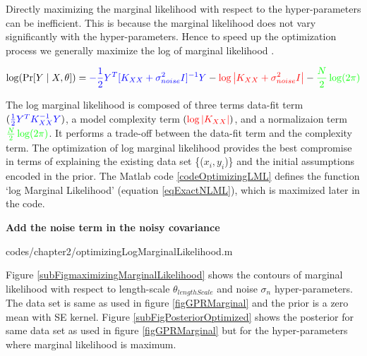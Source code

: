 Directly maximizing the marginal likelihood with respect to the hyper-parameters can be inefficient. This is because the marginal likelihood does not vary significantly with the hyper-parameters. Hence to speed up the optimization process we generally maximize the log of marginal likelihood \cite{rasmussen2006gaussian}. 

  \begin{equation}\label{eqExactNLML}
\log(\Pr [Y \mid X, \theta ]) = \textcolor{blue}{-\frac{1}{2}Y^{T}[K_{XX}+ \sigma_{noise}^{2}I]^{-1}Y} - \textcolor{red}{\log\left |  K_{XX}+ \sigma_{noise}^{2}I\right |} - \textcolor{green}{\frac{N}{2}\log(2\pi)}
  \end{equation}

The log marginal likelihood is composed of three terms data-fit term $( \textcolor{blue}{\frac{1}{2}Y^{T}K_{XX}^{-1}Y})$, a model complexity term $( \textcolor{red}{\log\left |  K_{XX}\right |})$, and a normalizaion term $\textcolor{green}{\frac{N}{2}\log(2\pi)}$. It performs a trade-off between the data-fit term and the complexity term. The optimization of log marginal likelihood provides the best compromise in terms of explaining the existing data set \{($x_{i}, y_{i}$)\} and the initial assumptions encoded in the prior. The Matlab code \ref{codeOptimizingLML} defines the function `log Marginal Likelihood' (equation \ref{eqExactNLML}), which is maximized later in the code.

\textbf{Add the noise term in the noisy covariance}
\begin{mdframed}[hidealllines=true,backgroundcolor=lightgray!20]

                    {codes/chapter2/optimizingLogMarginalLikelihood.m}
\end{mdframed}

Figure \ref{subFigmaximizingMarginalLikelihood} shows the contours of marginal likelihood with respect to length-scale $\theta_{lengthScale}$ and noise $\sigma_{n}$ hyper-parameters. The data set is same as used in figure \ref{figGPRMarginal} and the prior is a zero mean with SE kernel. Figure \ref{subFigPosteriorOptimized} shows the posterior for same data set as used in figure \ref{figGPRMarginal} but for the hyper-parameters where marginal likelihood is maximum. 

